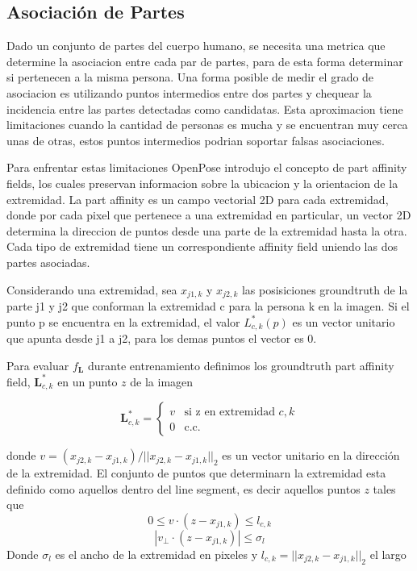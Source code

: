 \documentclass[runningheads]{llncs}
\begin{document}
\subsection{Asociación de Partes}
Dado un conjunto de partes del cuerpo humano, se necesita una metrica que determine la asociacion entre cada par de partes, para de esta forma determinar si pertenecen a la misma persona. Una forma posible de medir el grado de asociacion es utilizando puntos intermedios entre dos partes y chequear la incidencia entre las partes detectadas como candidatas. Esta aproximacion tiene limitaciones cuando la cantidad de personas es mucha y se encuentran muy cerca unas de otras, estos puntos intermedios podrian soportar falsas asociaciones.

Para enfrentar estas limitaciones OpenPose introdujo el concepto de part affinity fields, los cuales preservan informacion sobre la ubicacion y la orientacion de la extremidad. La part affinity es un campo vectorial 2D para cada extremidad, donde por cada pixel que pertenece a una extremidad en particular, un vector 2D determina la direccion de puntos desde una parte de la extremidad hasta la otra. Cada tipo de extremidad tiene un correspondiente affinity field uniendo las dos partes asociadas.

Considerando una extremidad, sea $x_{j1,k}$ y $x_{j2,k}$ las posisiciones groundtruth de la parte j1 y j2 que conforman la extremidad c para la persona k en la imagen. Si el punto p se encuentra en la extremidad, el valor $L^{*}_{c,k}(p)$ es un vector unitario que apunta desde j1 a j2, para los demas puntos el vector es 0.

Para evaluar $f_{\textbf{L}}$ durante entrenamiento definimos los groundtruth part affinity field, $\textbf{L}_{c,k}^*$ en un punto $z$ de la imagen

\begin{equation}
\textbf{L}_{c,k}^* = \begin{cases}
v &\text{si z en extremidad $c,k$}\\
0 &\text{c.c.}
\end{cases}
\end{equation}

donde $v = (x_{j2,k}-x_{j1,k})/||x_{j2,k}-x_{j1,k}||_2$ es un vector unitario en la dirección de la extremidad. El conjunto de puntos que determinarn la extremidad esta definido como aquellos dentro del line segment, es decir aquellos puntos $z$ tales que 
\begin{equation}
0 \le v \cdot (z - x_{j1,k}) \le l_{c,k}
\end{equation}
\begin{equation}
|v_{\perp} \cdot (z - x_{j1,k})| \le \sigma_{l}
\end{equation}
Donde $\sigma_{l}$ es el ancho de la extremidad en pixeles y $l_{c,k}=||x_{j2,k}-x_{j1,k}||_2$ el largo
\end{document}
